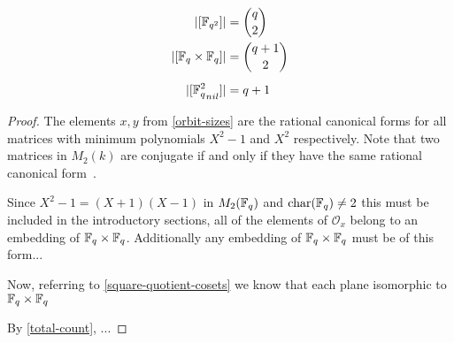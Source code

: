 \documentclass{amsart}
\begin{document}
\begin{theorem}
    \begin{align}
        |[\protect\mathbb{F}_{q^2}]|                  &= \binom{q}{2} \\
        |[\protect\mathbb{F}_q \times \protect\mathbb{F}_q]|         &= \binom{q + 1}{2} \\[0.5em]
        |[{\protect\mathbb{F}_q^2}_{nil}]|            &= q + 1
    \end{align}
\end{theorem}
\begin{proof}
    The elements $x, y$ from \cref{orbit-sizes} are the rational canonical forms for all matrices with minimum polynomials $X^2 - 1$ and $X^2$ respectively. Note that two matrices in $M_2(k)$ are conjugate if and only if they have the same rational canonical form~\cite{DandF}.

Since $X^2 - 1 = (X + 1)(X - 1)$ in $M_2(\protect\mathbb{F}_q)$ and $\operatorname{char}(\protect\mathbb{F}_q) \neq 2$ {\color{blue} this must be included in the introductory sections}, all of the elements of $\mathcal{O}_x$ belong to an embedding of $\protect\mathbb{F}_q \times \protect\mathbb{F}_q$. Additionally any embedding of $\protect\mathbb{F}_q \times \protect\mathbb{F}_q$ must be of this form...

Now, referring to \cref{square-quotient-cosets} we know that each plane isomorphic to $\protect\mathbb{F}_q \times \protect\mathbb{F}_q$

By \cref{total-count}, ...
\end{proof}

\begin{bibdiv}
    \begin{biblist}
    \end{biblist}
\end{bibdiv}
\end{document}
